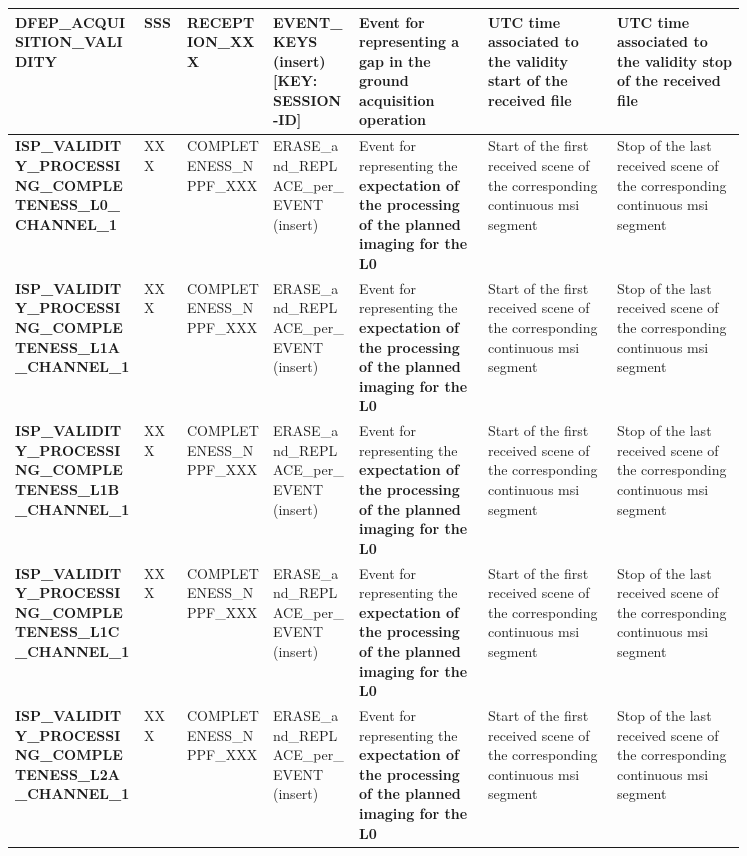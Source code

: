 \begin{landscape}
\begin{longtable}{|M{0.15\linewidth}|M{0.05\linewidth}|M{0.10\linewidth}|M{0.10\linewidth}|M{0.15\linewidth}|M{0.15\linewidth}|M{0.15\linewidth}|}
\textbf{DFEP\_ACQUISITION\_VALIDITY} & SSS & \- RECEPTION\_XXX & EVENT\_KEYS (insert) [KEY: SESSION-ID] & Event for representing a \textbf{gap in the ground acquisition operation} & UTC time associated to the validity start of the received file & UTC time associated to the validity stop of the received file \\ \hline
\textbf{ISP\_VALIDITY\_PROCESSING\_COMPLETENESS\_L0\_CHANNEL\_1} & XXX & \- COMPLETENESS\_NPPF\_XXX & ERASE\_and\_REPLACE\_per\_EVENT (insert) & Event for representing the \textbf{expectation of the processing of the planned imaging for the L0} & Start of the first received scene of the corresponding continuous \acrshort{msi} segment & Stop of the last received scene of the corresponding continuous \acrshort{msi} segment \\ \hline
\textbf{ISP\_VALIDITY\_PROCESSING\_COMPLETENESS\_L1A\_CHANNEL\_1} & XXX & \- COMPLETENESS\_NPPF\_XXX & ERASE\_and\_REPLACE\_per\_EVENT (insert) & Event for representing the \textbf{expectation of the processing of the planned imaging for the L0} & Start of the first received scene of the corresponding continuous \acrshort{msi} segment & Stop of the last received scene of the corresponding continuous \acrshort{msi} segment \\ \hline
\textbf{ISP\_VALIDITY\_PROCESSING\_COMPLETENESS\_L1B\_CHANNEL\_1} & XXX & \- COMPLETENESS\_NPPF\_XXX & ERASE\_and\_REPLACE\_per\_EVENT (insert) & Event for representing the \textbf{expectation of the processing of the planned imaging for the L0} & Start of the first received scene of the corresponding continuous \acrshort{msi} segment & Stop of the last received scene of the corresponding continuous \acrshort{msi} segment \\ \hline
\textbf{ISP\_VALIDITY\_PROCESSING\_COMPLETENESS\_L1C\_CHANNEL\_1} & XXX & \- COMPLETENESS\_NPPF\_XXX & ERASE\_and\_REPLACE\_per\_EVENT (insert) & Event for representing the \textbf{expectation of the processing of the planned imaging for the L0} & Start of the first received scene of the corresponding continuous \acrshort{msi} segment & Stop of the last received scene of the corresponding continuous \acrshort{msi} segment \\ \hline
\textbf{ISP\_VALIDITY\_PROCESSING\_COMPLETENESS\_L2A\_CHANNEL\_1} & XXX & \- COMPLETENESS\_NPPF\_XXX & ERASE\_and\_REPLACE\_per\_EVENT (insert) & Event for representing the \textbf{expectation of the processing of the planned imaging for the L0} & Start of the first received scene of the corresponding continuous \acrshort{msi} segment & Stop of the last received scene of the corresponding continuous \acrshort{msi} segment \\ \hline

\end{longtable}
\end{landscape}
